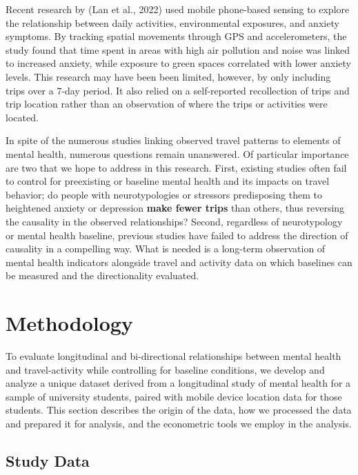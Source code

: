 \documentclass[
  letterpaper,
  number,
  review,
  3p]{elsarticle}
\begin{document}
Recent research by (Lan et al., 2022) used mobile phone-based sensing to
explore the relationship between daily activities, environmental
exposures, and anxiety symptoms. By tracking spatial movements through
GPS and accelerometers, the study found that time spent in areas with
high air pollution and noise was linked to increased anxiety, while
exposure to green spaces correlated with lower anxiety levels. This
research may have been been limited, however, by only including trips
over a 7-day period. It also relied on a self-reported recollection of
trips and trip location rather than an observation of where the trips or
activities were located.

In spite of the numerous studies linking observed travel patterns to
elements of mental health, numerous questions remain unanswered. Of
particular importance are two that we hope to address in this research.
First, existing studies often fail to control for preexisting or
baseline mental health and its impacts on travel behavior; do people
with neurotypologies or stressors predisposing them to heightened
anxiety or depression \textbf{make fewer trips} than others, thus
reversing the causality in the observed relationships? Second,
regardless of neurotypology or mental health baseline, previous studies
have failed to address the direction of causality in a compelling way.
What is needed is a long-term observation of mental health indicators
alongside travel and activity data on which baselines can be measured
and the directionality evaluated.


\section{Methodology}\label{methodology}

To evaluate longitudinal and bi-directional relationships between mental
health and travel-activity while controlling for baseline conditions, we
develop and analyze a unique dataset derived from a longitudinal study
of mental health for a sample of university students, paired with mobile
device location data for those students. This section describes the
origin of the data, how we processed the data and prepared it for
analysis, and the econometric tools we employ in the analysis.

\subsection{Study Data}\label{study-data}
\end{document}
